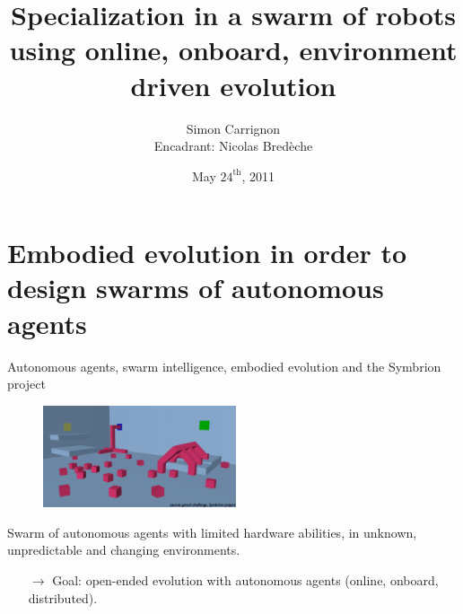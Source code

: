 \documentclass[8pt,handout,notes=show]{beamer}
\author[]{Simon Carrignon \\ 
\vfill Encadrant: Nicolas Bred\`{e}che }
\institute[]{
École~Pratique~des~Hautes~Études, \and TAO/LRI\\
\pgfdeclareimage[height=0.5cm]{ephe}{images/logo_ephe_large.jpg} %
\pgfuseimage{ephe} \hfill \pgfdeclareimage[height=0.5cm]{inria}{images/taologo.jpg} %
\pgfuseimage{inria}}
\title{Specialization in a swarm of robots using online, onboard, environment driven evolution}
\date{May $24^{\text{th}}$, 2011}
\begin{document}
\begin{frame}
\maketitle
 
\end{frame}

 \section{Embodied evolution in order to design swarms of autonomous agents}
\begin{frame}{Autonomous agents, swarm intelligence, embodied evolution and the Symbrion project}
        \begin{figure}
                \includegraphics[height=3cm]{images/symbrion-gc1b.png}
        \end{figure}
	
	Swarm of autonomous agents with limited hardware abilities, in unknown, unpredictable and changing environments. 
	\begin{itemize}
	 \item[$\rightarrow$] Goal: open-ended evolution with autonomous agents (online, onboard, distributed).
	\end{itemize}


\end{frame}


\end{document}
